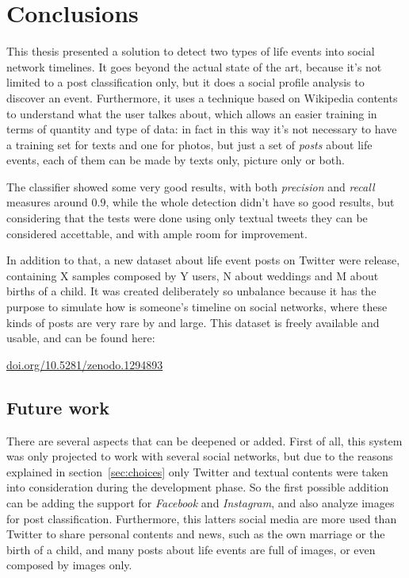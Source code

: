 \chapter{Conclusions}
\label{cha:conclusions}
This thesis presented a solution to detect two types of life events into social network timelines. It goes beyond the actual state of the art, because it's not limited to a post classification only, but it does a social profile analysis to discover an event. Furthermore, it uses a technique based on Wikipedia contents to understand what the user talkes about, which allows an easier training in terms of quantity and type of data: in fact in this way it's not necessary to have a training set for texts and one for photos, but just a set of \emph{posts} about life events, each of them can be made by texts only, picture only or both.

The classifier showed some very good results, with both \emph{precision} and \emph{recall} measures around $0.9$, while the whole detection didn't have so good results, but considering that the tests were done using only textual tweets they can be considered accettable, and with ample room for improvement.

In addition to that, a new dataset about life event posts on Twitter were release, containing X samples composed by Y users, N about weddings and M about births of a child. It was created deliberately so unbalance because it has the purpose to simulate how is someone's timeline on social networks, where these kinds of posts are very rare by and large. This dataset is freely available and usable, and can be found here:
\begin{center}
\url{doi.org/10.5281/zenodo.1294893}
\end{center}

\section{Future work}
\label{sec:futurework}
There are several aspects that can be deepened or added. First of all, this system was only projected to work with several social networks, but due to the reasons explained in section~\ref{sec:choices} only Twitter and textual contents were taken into consideration during the development phase. So the first possible addition can be adding the support for \emph{Facebook} and \emph{Instagram}, and also analyze images for post classification. Furthermore, this latters social media are more used than Twitter to share personal contents and news, such as the own marriage or the birth of a child, and many posts about life events are full of images, or even composed by images only.

